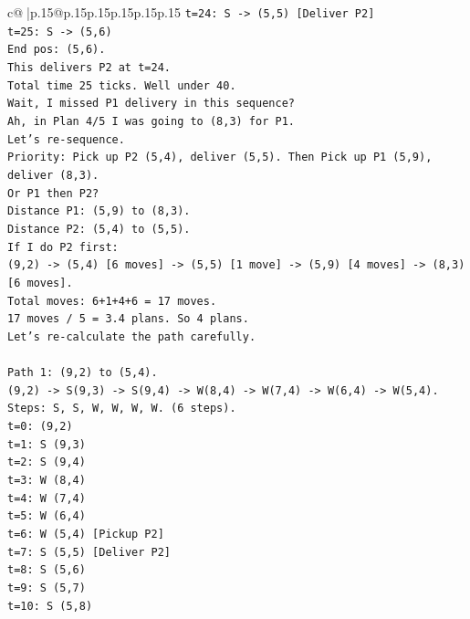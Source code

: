 \documentclass{article}
\begin{document}
{\begin{supertabular}{c@{$\;$}|p{.15\linewidth}@{}p{.15\linewidth}p{.15\linewidth}p{.15\linewidth}p{.15\linewidth}p{.15\linewidth}}
{{{\texttt{t=24: S {-}> (5,5) {[}Deliver P2{]}} \\
\texttt{t=25: S {-}> (5,6)} \\
\texttt{End pos: (5,6).} \\
\texttt{This delivers P2 at t=24.} \\
\texttt{Total time 25 ticks. Well under 40.} \\
\texttt{Wait, I missed P1 delivery in this sequence?} \\
\texttt{Ah, in Plan 4/5 I was going to (8,3) for P1.} \\
\texttt{Let's re{-}sequence.} \\
\texttt{Priority: Pick up P2 (5,4), deliver (5,5). Then Pick up P1 (5,9), deliver (8,3).} \\
\texttt{Or P1 then P2?} \\
\texttt{Distance P1: (5,9) to (8,3).} \\
\texttt{Distance P2: (5,4) to (5,5).} \\
\texttt{If I do P2 first:} \\
\texttt{(9,2) {-}> (5,4) {[}6 moves{]} {-}> (5,5) {[}1 move{]} {-}> (5,9) {[}4 moves{]} {-}> (8,3) {[}6 moves{]}.} \\
\texttt{Total moves: 6+1+4+6 = 17 moves.} \\
\texttt{17 moves / 5 = 3.4 plans. So 4 plans.} \\
\texttt{Let's re{-}calculate the path carefully.} \\
\\ 
\texttt{Path 1: (9,2) to (5,4).} \\
\texttt{(9,2) {-}> S(9,3) {-}> S(9,4) {-}> W(8,4) {-}> W(7,4) {-}> W(6,4) {-}> W(5,4).} \\
\texttt{Steps: S, S, W, W, W, W. (6 steps).} \\
\texttt{t=0: (9,2)} \\
\texttt{t=1: S (9,3)} \\
\texttt{t=2: S (9,4)} \\
\texttt{t=3: W (8,4)} \\
\texttt{t=4: W (7,4)} \\
\texttt{t=5: W (6,4)} \\
\texttt{t=6: W (5,4) {[}Pickup P2{]}} \\
\texttt{t=7: S (5,5) {[}Deliver P2{]}} \\
\texttt{t=8: S (5,6)} \\
\texttt{t=9: S (5,7)} \\
\texttt{t=10: S (5,8)} \\
}}}
\end{supertabular}}
\end{document}
